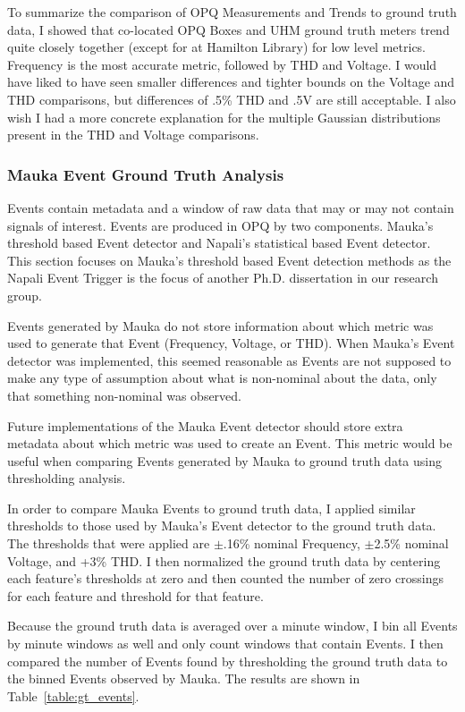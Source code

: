 To summarize the comparison of OPQ Measurements and Trends to ground truth data, I showed that co-located OPQ Boxes and UHM ground truth meters trend quite closely together (except for at Hamilton Library) for low level metrics. Frequency is the most accurate metric, followed by THD and Voltage. I would have liked to have seen smaller differences and tighter bounds on the Voltage and THD comparisons, but differences of .5\% THD and .5V are still acceptable. I also wish I had a more concrete explanation for the multiple Gaussian distributions present in the THD and Voltage comparisons.

\subsubsection{Mauka Event Ground Truth Analysis}

Events contain metadata and a window of raw data that may or may not contain signals of interest. Events are produced in OPQ by two components. Mauka's threshold based Event detector and Napali's statistical based Event detector. This section focuses on Mauka's threshold based Event detection methods as the Napali Event Trigger is the focus of another Ph.D. dissertation in our research group.

Events generated by Mauka do not store information about which metric was used to generate that Event (Frequency, Voltage, or THD). When Mauka's Event detector was implemented, this seemed reasonable as Events are not supposed to make any type of assumption about what is non-nominal about the data, only that something non-nominal was observed.

Future implementations of the Mauka Event detector should store extra metadata about which metric was used to create an Event. This metric would be useful when comparing Events generated by Mauka to ground truth data using thresholding analysis.

In order to compare Mauka Events to ground truth data, I applied similar thresholds to those used by Mauka's Event detector to the ground truth data. The thresholds that were applied are $\pm$.16\% nominal Frequency, $\pm$2.5\% nominal Voltage, and +3\% THD. I then normalized the ground truth data by centering each feature's thresholds at zero and then counted the number of zero crossings for each feature and threshold for that feature.

Because the ground truth data is averaged over a minute window, I bin all Events by minute windows as well and only count windows that contain Events. I then compared the number of Events found by thresholding the ground truth data to the binned Events observed by Mauka. The results are shown in Table~\ref{table:gt_events}.

